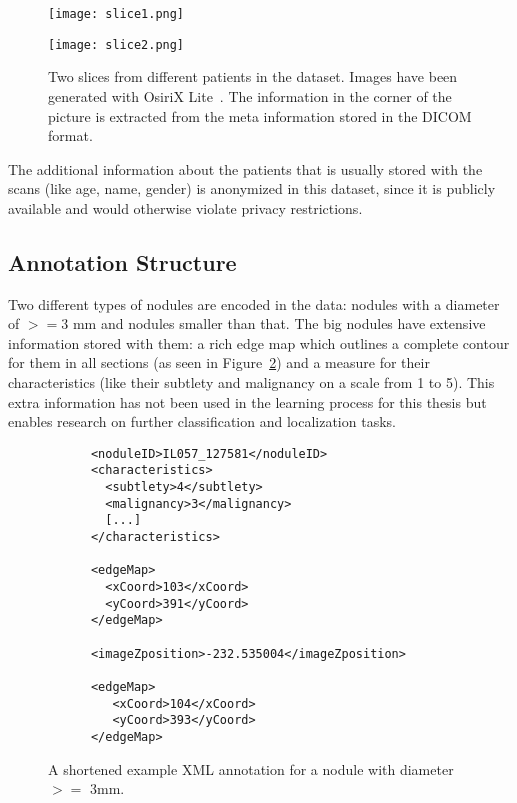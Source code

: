 \documentclass[../Thesis.tex]{subfiles}
\begin{document}
\begin{figure}[!tbp]
\centering
\begin{minipage}[b]{0.7\textwidth}
	\texttt{[image: slice1.png]}
\end{minipage}
\begin{minipage}[b]{0.7\textwidth}
	\texttt{[image: slice2.png]}
\end{minipage}
\caption{Two slices from different patients in the dataset. Images have been generated with OsiriX Lite~\cite{rosset2004osirix}. The information in the corner of the picture is extracted from the meta information stored in the DICOM format.}
\label{fig:slices}
\end{figure}

The additional information about the patients that is usually stored with the scans (like age, name, gender) is anonymized in this dataset, since it is publicly available and would otherwise violate privacy restrictions.

\subsection{Annotation Structure}
Two different types of nodules are encoded in the data: nodules with a diameter of $>=3$ mm and nodules smaller than that. The big nodules have extensive information stored with them: a rich edge map which outlines a complete contour for them in all sections (as seen in Figure~\ref{fig:bigNod}) and a measure for their characteristics (like their subtlety and malignancy on a scale from 1 to 5). This extra information has not been used in the learning process for this thesis but enables research on further classification and localization tasks.

\begin{figure}
\begin{lstlisting}
      <noduleID>IL057_127581</noduleID>
      <characteristics>
        <subtlety>4</subtlety>
        <malignancy>3</malignancy>
        [...]
      </characteristics>
      
      <edgeMap>
        <xCoord>103</xCoord>
        <yCoord>391</yCoord>
      </edgeMap>
 
      <imageZposition>-232.535004</imageZposition>
       
      <edgeMap>
         <xCoord>104</xCoord>
         <yCoord>393</yCoord>
      </edgeMap>
\end{lstlisting}
\caption{A shortened example XML annotation for a nodule with diameter $>=$ 3mm.}
\label{fig:bigNod}
\end{figure}
\end{document}

